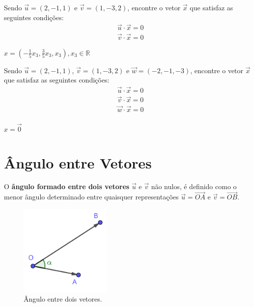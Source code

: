 \begin{exer}
  Sendo $\vec{u}=(2,-1,1)$ e $\vec{v}=(1,-3,2)$, encontre o vetor $\vec{x}$ que satisfaz as seguintes condições:
  \begin{align}
    &\vec{u}\cdot\vec{x} = 0\\
    &\vec{v}\cdot\vec{x} = 0
  \end{align}
\end{exer}
\begin{resp}
  $\displaystyle x = \left(-\frac{1}{5}x_3, \frac{3}{5}x_3, x_3\right), x_3\in\mathbb{R}$
\end{resp}

\begin{exer}
  Sendo $\vec{u}=(2,-1,1)$, $\vec{v}=(1,-3,2)$ e $\vec{w}=(-2,-1,-3)$, encontre o vetor $\vec{x}$ que satisfaz as seguintes condições:
  \begin{align}
    &\vec{u}\cdot\vec{x} = 0\\
    &\vec{v}\cdot\vec{x} = 0\\
    &\vec{w}\cdot\vec{x} = 0\\
  \end{align}
\end{exer}
\begin{resp}
  $x = \vec{0}$
\end{resp}

\section{Ângulo entre Vetores}\label{cap_produtos_sec_angulo}
\badgeRevisar

O {\bf ângulo formado entre dois vetores} $\vec{u}$ e $\vec{v}$ não nulos, é definido como o menor ângulo determinado entre quaisquer representações $\vec{u} = \overrightarrow{OA}$ e $\vec{v} = \overrightarrow{OB}$.

\begin{figure}[H]
  \centering
  \includegraphics[width=0.4\textwidth]{./cap_produtos/dados/fig_vetangulo/fig_vetangulo}
  \caption{Ângulo entre dois vetores.}
  \label{fig:prodesc_vetangulo}
\end{figure}

